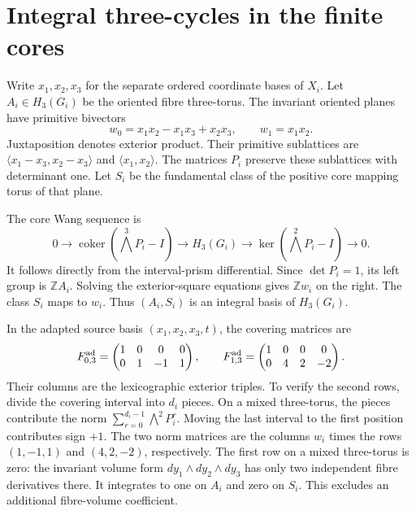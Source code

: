 \section{Integral three-cycles in the finite cores}

Write $x_1,x_2,x_3$ for the separate ordered coordinate bases of $X_i$.
Let $A_i\in H_3(G_i)$ be the oriented fibre three-torus.
The invariant oriented planes have primitive bivectors
\[
w_0=x_1x_2-x_1x_3+x_2x_3,\qquad w_1=x_1x_2.
\]
Juxtaposition denotes exterior product.
Their primitive sublattices are
$\langle x_1-x_3,x_2-x_3\rangle$ and $\langle x_1,x_2\rangle$.
The matrices $P_i$ preserve these sublattices with determinant one.
Let $S_i$ be the fundamental class of the positive core mapping torus of that plane.

The core Wang sequence is
\[
0\longrightarrow
\operatorname{coker}(\bigwedge^3P_i-I)
\longrightarrow H_3(G_i)
\longrightarrow\ker(\bigwedge^2P_i-I)
\longrightarrow0.
\]
It follows directly from the interval-prism differential.
Since $\det P_i=1$, its left group is $\mathbb Z A_i$.
Solving the exterior-square equations gives $\mathbb Zw_i$ on the right.
The class $S_i$ maps to $w_i$.
Thus $(A_i,S_i)$ is an integral basis of $H_3(G_i)$.

In the adapted source basis $(x_1,x_2,x_3,t)$, the covering matrices are
\[
F^{\rm ad}_{0,3}=
\begin{pmatrix}1&0&0&0\\0&1&-1&1\end{pmatrix},\qquad
F^{\rm ad}_{1,3}=
\begin{pmatrix}1&0&0&0\\0&4&2&-2\end{pmatrix}.
\]
Their columns are the lexicographic exterior triples.
To verify the second rows, divide the covering interval into $d_i$ pieces.
On a mixed three-torus, the pieces contribute the norm
$\sum_{r=0}^{d_i-1}\bigwedge^2P_i^r$.
Moving the last interval to the first position contributes sign $+1$.
The two norm matrices are the columns $w_i$ times the rows
$(1,-1,1)$ and $(4,2,-2)$, respectively.
The first row on a mixed three-torus is zero:
the invariant volume form $dy_1\wedge dy_2\wedge dy_3$
has only two independent fibre derivatives there.
It integrates to one on $A_i$ and zero on $S_i$.
This excludes an additional fibre-volume coefficient.

